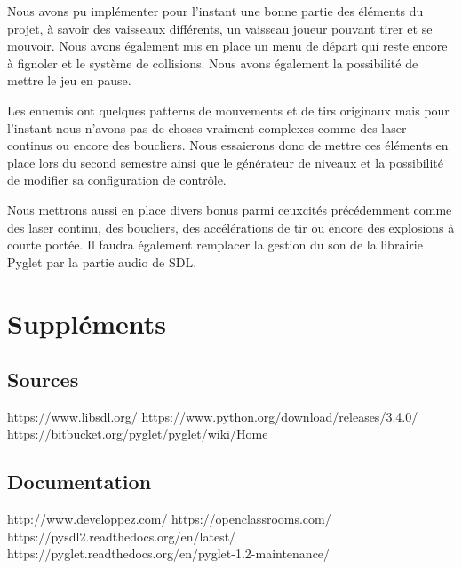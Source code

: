 \documentclass[a4paper, 12pt]{report}
\begin{document}
Nous avons pu implémenter pour l'instant une bonne partie des éléments du
projet, à savoir des vaisseaux différents, un vaisseau joueur pouvant tirer et
se mouvoir. Nous avons également mis en place un menu de départ qui reste
encore à fignoler et le système de collisions. Nous avons également la
possibilité de mettre le jeu en pause. \newline

\noindent Les ennemis ont quelques patterns de mouvements et de tirs originaux
mais pour l'instant nous n'avons pas de choses vraiment complexes comme des
laser continus ou encore des boucliers. Nous essaierons donc de mettre ces
éléments en place lors du second semestre ainsi que le générateur de niveaux et
la possibilité de modifier sa configuration de contrôle. \newline

\noindent Nous mettrons aussi en place divers bonus parmi ceux\newline cités
précédemment comme des laser continu, des boucliers, des accélérations de tir
ou encore des explosions à courte portée. Il faudra également remplacer la
gestion du son de la librairie Pyglet par la partie audio de SDL\@.

\chapter{Suppléments}
	\section{Sources}
\noindent https://www.libsdl.org/ \newline
https://www.python.org/download/releases/3.4.0/ \newline
https://bitbucket.org/pyglet/pyglet/wiki/Home

	\section{Documentation}
\noindent http://www.developpez.com/ \newline
https://openclassrooms.com/ \newline
https://pysdl2.readthedocs.org/en/latest/ \newline
https://pyglet.readthedocs.org/en/pyglet-1.2-maintenance/
\end{document}

